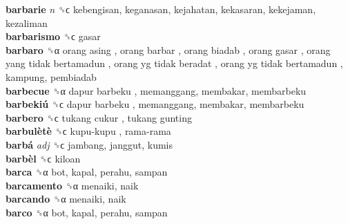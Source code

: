 \textbf{barbarie} \emph{n}  ␝ϲ  kebengisan, keganasan, kejahatan, kekasaran, kekejaman, kezaliman  \\
\textbf{barbarismo} ␝ϲ  gasar  \\
\textbf{barbaro} ␝α   orang asing ,  orang barbar ,  orang biadab ,  orang gasar ,  orang yang tidak bertamadun ,  orang yg tidak beradat ,  orang yg tidak bertamadun , kampung, pembiadab  \\
\textbf{barbecue} ␝α   dapur barbeku , memanggang, membakar, membarbeku  \\
\textbf{barbekiú} ␝ϲ   dapur barbeku , memanggang, membakar, membarbeku  \\
\textbf{barbero} ␝ϲ   tukang cukur ,  tukang gunting   \\
\textbf{barbulètè} ␝ϲ   kupu-kupu ,  rama-rama   \\
\textbf{barbá} \emph{adj}  ␝ϲ  jambang, janggut, kumis  \\
\textbf{barbèl} ␝ϲ  kiloan  \\
\textbf{barca} ␝α  bot, kapal, perahu, sampan  \\
\textbf{barcamento} ␝α  menaiki, naik  \\
\textbf{barcando} ␝α  menaiki, naik  \\
\textbf{barco} ␝α  bot, kapal, perahu, sampan  \\
